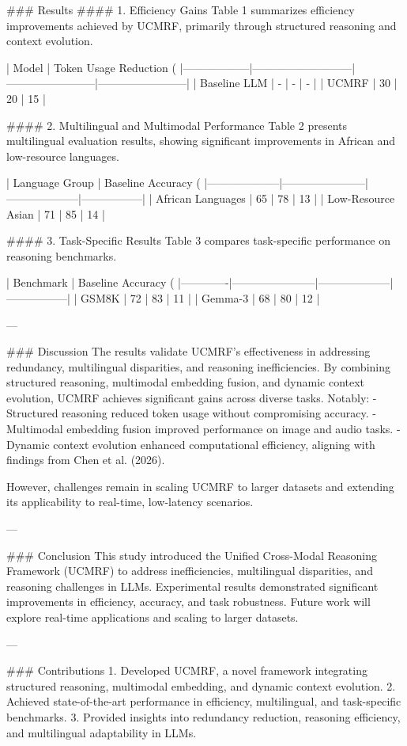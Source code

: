 ### Results
#### 1. Efficiency Gains
Table 1 summarizes efficiency improvements achieved by UCMRF, primarily through structured reasoning and context evolution.

| Model           | Token Usage Reduction (%
|------------------|---------------------------|------------------------|------------------------|
| Baseline LLM     | -                         | -                      | -                      |
| UCMRF            | 30                        | 20                     | 15                    |

#### 2. Multilingual and Multimodal Performance
Table 2 presents multilingual evaluation results, showing significant improvements in African and low-resource languages.

| Language Group     | Baseline Accuracy (%
|--------------------|-----------------------|--------------------|-----------------|
| African Languages  | 65                    | 78                 | 13              |
| Low-Resource Asian | 71                    | 85                 | 14              |

#### 3. Task-Specific Results
Table 3 compares task-specific performance on reasoning benchmarks.

| Benchmark   | Baseline Accuracy (%
|-------------|-----------------------|--------------------|-----------------|
| GSM8K       | 72                    | 83                 | 11              |
| Gemma-3     | 68                    | 80                 | 12              |

---

### Discussion
The results validate UCMRF's effectiveness in addressing redundancy, multilingual disparities, and reasoning inefficiencies. By combining structured reasoning, multimodal embedding fusion, and dynamic context evolution, UCMRF achieves significant gains across diverse tasks. Notably:
- Structured reasoning reduced token usage without compromising accuracy.
- Multimodal embedding fusion improved performance on image and audio tasks.
- Dynamic context evolution enhanced computational efficiency, aligning with findings from Chen et al. (2026).

However, challenges remain in scaling UCMRF to larger datasets and extending its applicability to real-time, low-latency scenarios.

---

### Conclusion
This study introduced the Unified Cross-Modal Reasoning Framework (UCMRF) to address inefficiencies, multilingual disparities, and reasoning challenges in LLMs. Experimental results demonstrated significant improvements in efficiency, accuracy, and task robustness. Future work will explore real-time applications and scaling to larger datasets.

---

### Contributions
1. Developed UCMRF, a novel framework integrating structured reasoning, multimodal embedding, and dynamic context evolution.
2. Achieved state-of-the-art performance in efficiency, multilingual, and task-specific benchmarks.
3. Provided insights into redundancy reduction, reasoning efficiency, and multilingual adaptability in LLMs.